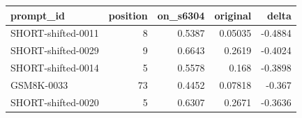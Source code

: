 \begin{table}
\label{tab:task3_prefix_disagreements}
\begin{tabular}{lrrrr}
\toprule
prompt\_id & position & on\_s6304 & original & delta \\
\midrule
SHORT-shifted-0011 & 8 & 0.5387 & 0.05035 & -0.4884 \\
SHORT-shifted-0029 & 9 & 0.6643 & 0.2619 & -0.4024 \\
SHORT-shifted-0014 & 5 & 0.5578 & 0.168 & -0.3898 \\
GSM8K-0033 & 73 & 0.4452 & 0.07818 & -0.367 \\
SHORT-shifted-0020 & 5 & 0.6307 & 0.2671 & -0.3636 \\
\bottomrule
\end{tabular}
\end{table}

